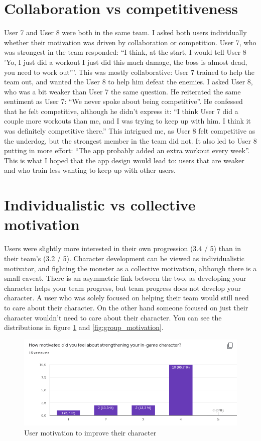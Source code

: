 \documentclass{l4proj}
\begin{document}
\section{Collaboration vs competitiveness}
User 7 and User 8 were both in the same team. I asked both users individually whether their motivation was driven by collaboration or competition. User 7, who was strongest in the team responded: ``I think, at the start, I would tell User 8 'Yo, I just did a workout I just did this much damage, the boss is almost dead, you need to work out'''. This was mostly collaborative: User 7 trained to help the team out, and wanted the User 8 to help him defeat the enemies. I asked User 8, who was a bit weaker than User 7 the same question. He reiterated the same sentiment as User 7: ``We never spoke about being competitive''.  He confessed that he felt competitive, although he didn't express it: ``I think User 7 did a couple more workouts than me, and I was trying to keep up with him. I think it was definitely competitive there.'' This intrigued me, as User 8 felt competitive as the underdog, but the strongest member in the team did not. It also led to User 8 putting in more effort: ``The app probably added an extra workout every week''. This is what I hoped that the app design would lead to: users that are weaker and who train less wanting to keep up with other users.

\section{Individualistic vs collective motivation}
Users were slightly more interested in their own progression (3.4 / 5) than in their team's (3.2 / 5). Character development can be viewed as individualistic motivator, and fighting the monster as a collective motivation, although there is a small caveat. There is an asymmetric link between the two, as developing your character helps your team progress, but team progress does not develop your character. A user who was solely focused on helping their team would still need to care about their character. On the other hand someone focused on just their character wouldn't need to care about their character. You can see the distributions in figure \ref{fig:character_motivation} and \ref{fig:group_motivation}.
\begin{figure}[H]
    \centering
    \includegraphics[width=1.0\linewidth]{ingame.png}    
    \caption{User motivation to improve their character}
    \label{fig:character_motivation} 
\end{figure}
\end{document}
